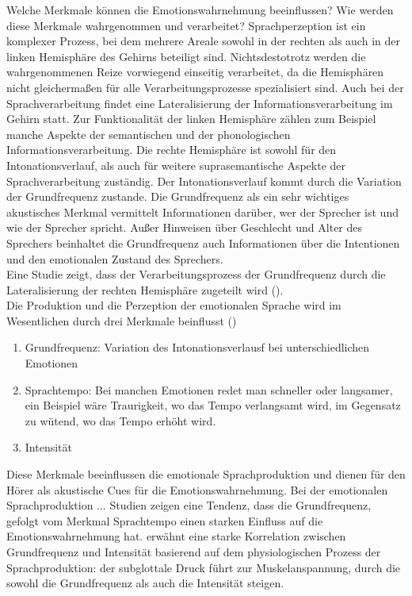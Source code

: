 \documentclass[11pt,a4paper,headsepline,twoside,toc=bibliography]{scrreprt}
\begin{document}
Welche Merkmale können die Emotionswahrnehmung beeinflussen? Wie werden diese Merkmale wahrgenommen und verarbeitet? Sprachperzeption ist ein komplexer Prozess, bei dem mehrere Areale sowohl in der rechten als auch in der linken Hemisphäre des Gehirns beteiligt sind. Nichtsdestotrotz werden die wahrgenommenen Reize vorwiegend einseitig verarbeitet, da die Hemisphären nicht gleichermaßen für alle Verarbeitungsprozesse spezialisiert sind. Auch bei der Sprachverarbeitung findet eine Lateralisierung der Informationsverarbeitung im Gehirn statt. Zur Funktionalität der linken Hemisphäre zählen zum Beispiel manche Aspekte der semantischen und der phonologischen Informationsverarbeitung. Die rechte Hemisphäre ist sowohl für den Intonationsverlauf, als auch für weitere suprasemantische Aspekte der Sprachverarbeitung zuständig. Der Intonationsverlauf kommt durch die Variation der Grundfrequenz zustande. Die Grundfrequenz als ein sehr wichtiges akustisches Merkmal vermittelt Informationen darüber, wer der Sprecher ist und wie der Sprecher spricht. Außer Hinweisen über Geschlecht und Alter des Sprechers beinhaltet die Grundfrequenz auch Informationen über die Intentionen und den emotionalen Zustand des Sprechers. \\

Eine Studie zeigt, dass der Verarbeitungsprozess der Grundfrequenz durch die Lateralisierung der rechten Hemisphäre zugeteilt wird (\cite{VanLancker1973a}). \\





Die Produktion und die Perzeption der emotionalen Sprache wird im Wesentlichen durch drei Merkmale beinflusst (\cite{Scherer2001})

\begin{enumerate}
	\item Grundfrequenz: Variation des Intonationsverlausf bei unterschiedlichen Emotionen 
	\item Sprachtempo: Bei manchen Emotionen redet man schneller oder langsamer, ein Beispiel wäre Traurigkeit, wo das Tempo verlangsamt wird, im Gegensatz zu wütend, wo das Tempo erhöht wird.
	\item Intensität
\end{enumerate}







Diese Merkmale beeinflussen die emotionale Sprachproduktion und dienen für den Hörer als akustische Cues für die Emotionswahrnehmung. Bei der emotionalen Sprachproduktion ... 
Studien zeigen eine Tendenz, dass die Grundfrequenz, gefolgt vom Merkmal Sprachtempo
einen starken Einfluss auf die Emotionswahrnehmung hat. \citeauthor{Banse1996} erwähnt eine starke Korrelation zwischen Grundfrequenz und Intensität basierend auf dem physiologischen Prozess der Sprachproduktion: der subglottale Druck führt zur Muskelanspannung, durch die sowohl die Grundfrequenz als auch die Intensität steigen.\\
\end{document}

